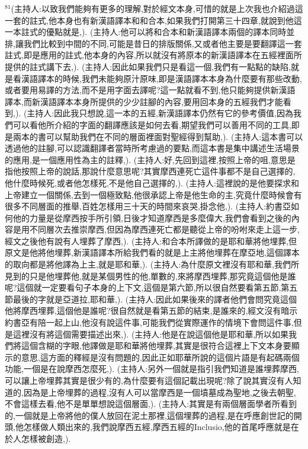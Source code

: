 \documentclass{book}
\begin{document}
$^{81}$(主持人:以致我們能夠有更多的理解,對於經文本身,可惜的就是上次我也介紹過這一套的註式,他本身也有新漢語譯本和和合本,如果我們打開第三十四章,就說到他這一本註式的優點就是,).
(主持人:他可以將和合本和新漢語譯本兩個的譯本同時並排,讓我們比較到中間的不同,可能是昔日的排版關係,又或者他主要是要翻譯這一套註式,即是應用的註式,他本身的內容,所以就沒有將原本的新漢語譯本在五經裡面所提供的註式講下去,).
(主持人:因此如果我們只是看這一個,我們有一點點的缺陷,就是看漢語譯本的時候,我們未能夠原汁原味,即是漢語譯本本身為什麼要有那些改動,或者要用易譯的方法,而不是用字面去譯呢?這一點就看不到,他只能夠提供新漢語譯本,而新漢語譯本本身所提供的少少註腳的內容,要用回本身的五經我們才能看到,).
(主持人:因此我只想說,這一本的五經,新漢語譯本仍然有它的參考價值,因為我們可以看他所介紹的字面的翻譯應該是如何去看,期望我們可以善用不同的工具,即是兩本的書可以幫助我們在不同的層面裡面對聖經得到幫助,).
(主持人:這本書可以透過他的註腳,可以認識翻譯者當時所考慮過的要點,而這本書是集中講述生活場景的應用,是一個應用性為主的註釋,).
(主持人:好,先回到這裡,按照上帝的咀,意思是指他按照上帝的說話,那說什麼意思呢?其實摩西連死亡這件事都不是自己選擇的,他什麼時候死,或者他怎樣死,不是他自己選擇的,).
(主持人:這裡說的是他要探求和上帝建立一個關係,去到一個極致點,他很承認上帝是他生命的主,究竟什麼時候會有很多不同層面的推舉,百姓怎樣用三十天的時間來哀哭,掛念他,).
(主持人:約書亞如何他的力量是從摩西按手所引領,日後才知道摩西是多麼偉大,我們會看到之後的內容是用不同層次去推崇摩西,但因為摩西連死亡都是聽從上帝的吩咐來走上這一步,經文之後他有說有人埋葬了摩西,).
(主持人:和合本所譯做的是耶和華將他埋葬,但原文是他將他埋葬,新漢語譯本所給我們看的就是上主將他埋葬在摩亞地,這個譯本的取向都是將他譯為上主,就是耶和華,).
(主持人:為什麼原文裡沒有耶和華,我們所見到的只是他埋葬他,就是某個男性的他,單數的,來將摩西埋葬,那究竟這個他是誰呢?這個就一定要看句子本身的上下文,這個是第六節,所以很自然要看第五節,第五節最後的字就是亞道拉,耶和華,).
(主持人:因此如果後來的譯者他們會問究竟這個他將摩西埋葬,這個他是誰呢?很自然就是看第五節的結束,是誰來的,經文沒有暗示約書亞有陪一起上山,他沒有說這件事,可能我們從實際運作的情境下會問這件事,但是這裡沒有將這個需要描述出來,).
(主持人:他是在說這個他是耶和華,所以如果我們將這個含糊的字眼,他譯做是耶和華將他埋葬,其實是很符合這裡上下文本身要顯示的意思,這方面的釋經是沒有問題的,因此正如耶華所說的這個片語是有起碼兩個功能,一個是在說摩西怎麼死,).
(主持人:另外一個就是指引我們知道是誰埋葬摩西,可以讓上帝埋葬其實是很少有的,為什麼要有這個記載出現呢?除了說其實沒有人知道的,因為是上帝埋葬的過程,沒有人可以當摩西是一個墳墓成為聖地,之後去朝聖,不會這樣去看,他不是單單想說這個層面,).
(主持人:其實是有兩個層面學者所看到的,一個就是上帝將他的僕人放回在泥土那裡,這個埋葬的過程,是在呼應創世記的開頭,他怎樣做人類出來的,我們說摩西五經,摩西五經的Inclusio,他的首尾呼應就是在於人怎樣被創造,).
\end{document}
